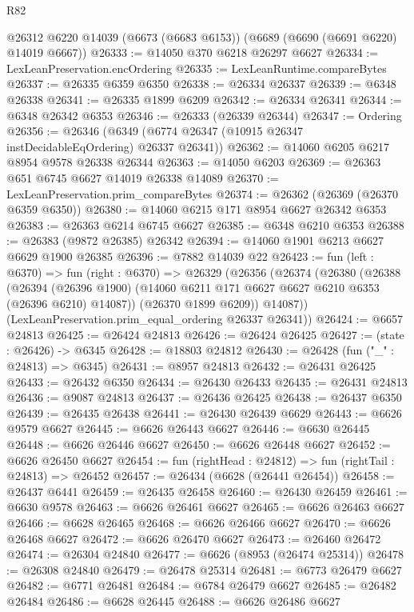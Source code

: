 \begin{lexlean}{R82}
\begin{coremodule}
    @26312
    @6220
    @14039
    (@6673 (@6683 @6153))
    (@6689 (@6690 (@6691 @6220) @14019 @6667))
@26333 := @14050 @370 @6218 @26297 @6627
@26334 := LexLeanPreservation.encOrdering
@26335 := LexLeanRuntime.compareBytes
@26337 := @26335 @6359 @6350
@26338 := @26334 @26337
@26339 := @6348 @26338
@26341 := @26335 @1899 @6209
@26342 := @26334 @26341
@26344 := @6348 @26342 @6353
@26346 := @26333 (@26339 @26344)
@26347 := Ordering
@26356 := @26346 (@6349 (@6774 @26347 (@10915 @26347 instDecidableEqOrdering) @26337 @26341))
@26362 := @14060 @6205 @6217 @8954 @9578 @26338 @26344
@26363 := @14050 @6203
@26369 := @26363 @651 @6745 @6627 @14019 @26338 @14089
@26370 := LexLeanPreservation.prim_compareBytes
@26374 := @26362 (@26369 (@26370 @6359 @6350))
@26380 := @14060 @6215 @171 @8954 @6627 @26342 @6353
@26383 := @26363 @6214 @6745 @6627
@26385 := @6348 @6210 @6353
@26388 := @26383 (@9872 @26385) @26342
@26394 := @14060 @1901 @6213 @6627 @6629 @1900 @26385
@26396 := @7882 @14039 @22
@26423 := fun (left : @6370) =>
  fun (right : @6370) =>
  @26329
    (@26356
      (@26374
        (@26380
          (@26388
            (@26394
              (@26396 @1900)
              (@14060 @6211 @171 @6627 @6627 @6210 @6353 (@26396 @6210) @14087))
            (@26370 @1899 @6209))
          @14087))
      (LexLeanPreservation.prim_equal_ordering @26337 @26341))
@26424 := @6657 @24813
@26425 := @26424 @24813
@26426 := @26424 @26425
@26427 := (state : @26426) -> @6345
@26428 := @18803 @24812
@26430 := @26428 (fun ("_" : @24813) => @6345)
@26431 := @8957 @24813
@26432 := @26431 @26425
@26433 := @26432 @6350
@26434 := @26430 @26433
@26435 := @26431 @24813
@26436 := @9087 @24813
@26437 := @26436 @26425
@26438 := @26437 @6350
@26439 := @26435 @26438
@26441 := @26430 @26439 @6629
@26443 := @6626 @9579 @6627
@26445 := @6626 @26443 @6627
@26446 := @6630 @26445
@26448 := @6626 @26446 @6627
@26450 := @6626 @26448 @6627
@26452 := @6626 @26450 @6627
@26454 := fun (rightHead : @24812) => fun (rightTail : @24813) => @26452
@26457 := @26434 (@6628 (@26441 @26454))
@26458 := @26437 @6441
@26459 := @26435 @26458
@26460 := @26430 @26459
@26461 := @6630 @9578
@26463 := @6626 @26461 @6627
@26465 := @6626 @26463 @6627
@26466 := @6628 @26465
@26468 := @6626 @26466 @6627
@26470 := @6626 @26468 @6627
@26472 := @6626 @26470 @6627
@26473 := @26460 @26472
@26474 := @26304 @24840
@26477 := @6626 (@8953 (@26474 @25314))
@26478 := @26308 @24840
@26479 := @26478 @25314
@26481 := @6773 @26479 @6627
@26482 := @6771 @26481
@26484 := @6784 @26479 @6627
@26485 := @26482 @26484
@26486 := @6628 @26445
@26488 := @6626 @26486 @6627

\end{coremodule}
\end{lexlean}
